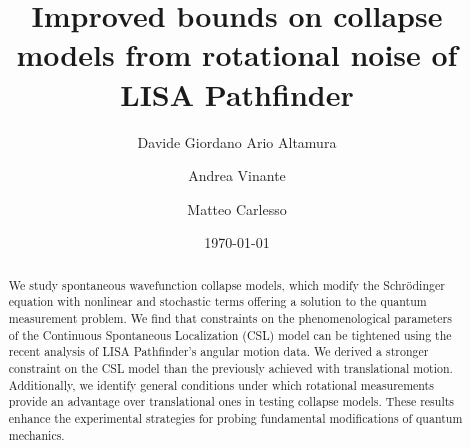 \documentclass[aps,twocolumn,pra,superscriptaddress]{revtex4-2}
\begin{document}
\author{Davide Giordano Ario Altamura}



\author{Andrea Vinante}

\author{Matteo Carlesso}



\title{
Improved bounds on collapse models from rotational noise of LISA Pathfinder}
%

\date{\today}
%
%
\begin{abstract}  

{%
{We study spontaneous wavefunction collapse models, which modify the Schrödinger equation with nonlinear and stochastic terms offering a solution to the quantum measurement problem. We find that constraints on the phenomenological parameters of the Continuous Spontaneous Localization (CSL) model can be tightened using the recent analysis of LISA Pathfinder’s angular motion data.
We derived a stronger constraint on the CSL model than the previously achieved with translational motion.
Additionally, we identify general conditions under which rotational measurements provide an advantage over translational ones in testing collapse models.
These results enhance the experimental strategies for probing fundamental modifications of quantum mechanics.}
}
\end{abstract}
%
\maketitle
%
\end{document}
